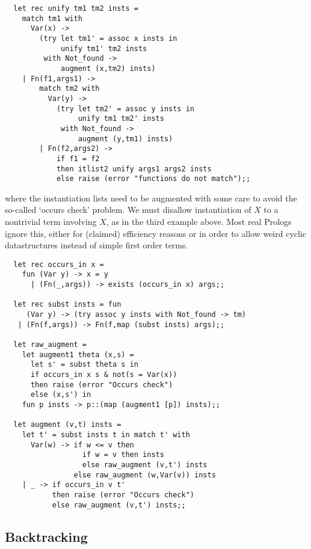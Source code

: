 \begin{boxed}\begin{verbatim}
  let rec unify tm1 tm2 insts =
    match tm1 with
      Var(x) ->
        (try let tm1' = assoc x insts in
             unify tm1' tm2 insts
         with Not_found ->
             augment (x,tm2) insts)
    | Fn(f1,args1) ->
        match tm2 with
          Var(y) ->
            (try let tm2' = assoc y insts in
                 unify tm1 tm2' insts
             with Not_found ->
                 augment (y,tm1) insts)
        | Fn(f2,args2) ->
            if f1 = f2
            then itlist2 unify args1 args2 insts
            else raise (error "functions do not match");;
\end{verbatim}\end{boxed}

\noindent where the instantiation lists need to be augmented with some care to
avoid the so-called `occurs check' problem. We must disallow instantiation of
$X$ to a nontrivial term involving $X$, as in the third example above. Most
real Prologs ignore this, either for (claimed) efficiency reasons or in order
to allow weird cyclic datastructures instead of simple first order terms.

\begin{boxed}\begin{verbatim}
  let rec occurs_in x =
    fun (Var y) -> x = y
      | (Fn(_,args)) -> exists (occurs_in x) args;;

  let rec subst insts = fun
     (Var y) -> (try assoc y insts with Not_found -> tm)
   | (Fn(f,args)) -> Fn(f,map (subst insts) args);;

  let raw_augment =
    let augment1 theta (x,s) =
      let s' = subst theta s in
      if occurs_in x s & not(s = Var(x))
      then raise (error "Occurs check")
      else (x,s') in
    fun p insts -> p::(map (augment1 [p]) insts);;

  let augment (v,t) insts =
    let t' = subst insts t in match t' with
      Var(w) -> if w <= v then
                  if w = v then insts
                  else raw_augment (v,t') insts
                else raw_augment (w,Var(v)) insts
    | _ -> if occurs_in v t'
           then raise (error "Occurs check")
           else raw_augment (v,t') insts;;
\end{verbatim}\end{boxed}

\subsection{Backtracking}

